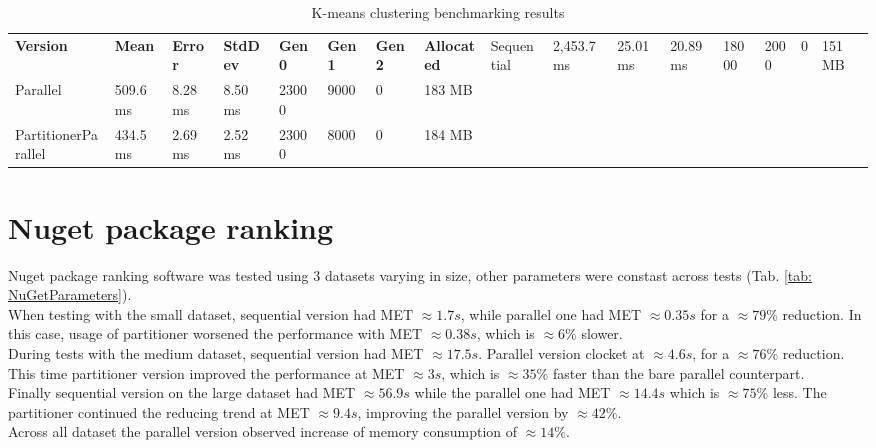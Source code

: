 \begin{sidewaystable}[!ht]
    \centering
    \caption{K-means clustering benchmarking results}
		\label{tab: KMeansBenchmarking}
    \begin{tabular}{lp{3cm}p{1.5cm}p{1.5cm}p{2cm}p{2cm}p{2cm}p{2cm}}
			\toprule
			\bfseries Version 	&
			\bfseries Mean    	&
			\bfseries Error	    &
			\bfseries StdDev	  &
			\bfseries Gen 0	    &
			\bfseries Gen 1	    &
			\bfseries Gen 2	    &
			\bfseries Allocated &
			\midrule 
Sequential & 2,453.7 ms	& 25.01ms	& 20.89ms	& 18000 & 	2000 & 	0 & 151 MB \\
Parallel & 509.6 ms	& 8.28 ms	& 8.50 ms	& 23000 & 	9000 & 	0 & 183 MB \\ 
PartitionerParallel & 434.5 ms	& 2.69 ms	& 2.52 ms	& 23000 & 	8000 & 	0 & 184 MB \\
			\bottomrule
    \end{tabular}
\end{sidewaystable}

\clearpage
\section{Nuget package ranking}
Nuget package ranking software was tested using 3 datasets varying in size, other parameters were constast across tests (Tab. \ref{tab: NuGetParameters}). \\
When testing with the small dataset, sequential version had MET $\approx 1.7s$, while parallel one had MET $\approx 0.35s$ for a $\approx 79\%$ reduction. In this case, usage of partitioner worsened the performance with MET  $\approx 0.38s$, which is $\approx 6\%$ slower. \\ 
During tests with the medium dataset, sequential version had MET $\approx 17.5s$. Parallel version clocket at $\approx 4.6s$, for a $\approx 76\%$ reduction. This time partitioner version improved the performance at MET $\approx 3s$, which is $\approx 35\%$ faster than the bare parallel counterpart. \\ 
Finally sequential version on the large dataset had MET $\approx 56.9s$ while the parallel one had MET $\approx 14.4s$ which is $\approx 75\%$ less.
The partitioner continued the reducing trend at MET $\approx 9.4s$, improving the parallel version by $\approx 42 \%$. \\
Across all dataset the parallel version observed increase of memory consumption of $\approx 14\%$.



